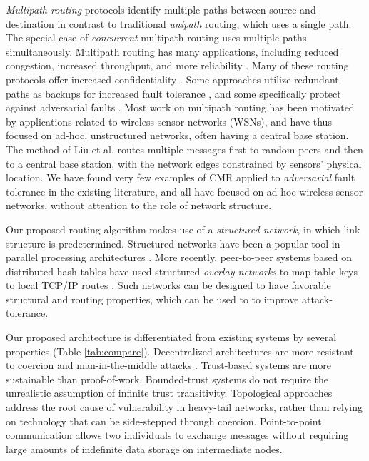 \documentclass[10pt,letterpaper]{article}
\begin{document}
{\em Multipath routing} protocols identify multiple paths between
source and destination
in contrast to traditional {\em unipath} routing, which uses
a single path.
The special case of {\em concurrent} multipath routing uses multiple paths
simultaneously.
Multipath routing has many applications, including reduced congestion,
increased throughput, and more reliability
\cite{qadir_exploiting_2015}.
Many of these routing protocols offer increased confidentiality
\cite{zin_survey_2015}.
Some approaches utilize redundant paths as backups for increased
fault tolerance
\cite{alrajeh_secure_2013},
and some specifically protect against adversarial faults
\cite{kohno_improvement_2012, khalil_unmask:_2010, lou_h-spread:_2006}.
Most work on multipath routing has been motivated by applications related to
wireless sensor networks (WSNs),
and have thus focused on ad-hoc, unstructured networks, often having a central
base station.
The method of Liu et al.
\cite{liu_secure_2012}
routes multiple messages first to random peers and then
to a central base station,
with the network edges constrained by sensors' physical location.
We have found very few examples of CMR applied to {\em adversarial}
fault tolerance in the existing literature,
and all have focused on ad-hoc wireless sensor networks, without attention
to the role of network structure.

Our proposed routing algorithm makes use of a
{\em structured network}, in which link structure is predetermined.
Structured networks have been a popular tool in parallel processing
architectures \cite{kshemkalyani_distributed_2008}.
More recently, peer-to-peer systems based on distributed hash tables have used
structured {\em overlay networks} to map table keys to local TCP/IP routes
\cite{lua_survey_2005,korzun_structured_2013}.
Such networks can be designed to have favorable structural and routing
properties,
which can be used to to improve attack-tolerance.

Our proposed architecture is differentiated from existing systems by several
properties (Table \ref{tab:compare}).
Decentralized architectures are more resistant to coercion
\cite{grewal_caveat_2013}
and man-in-the-middle attacks \cite{nayak_different_2010}.
Trust-based systems are more sustainable than proof-of-work.
Bounded-trust systems do not require the unrealistic assumption of infinite
trust transitivity.
Topological approaches address the root cause of vulnerability
in heavy-tail networks,
rather than relying on technology that can be side-stepped through coercion.
Point-to-point communication allows two individuals to exchange messages
without requiring large amounts of indefinite data storage on intermediate
nodes.
\end{document}
